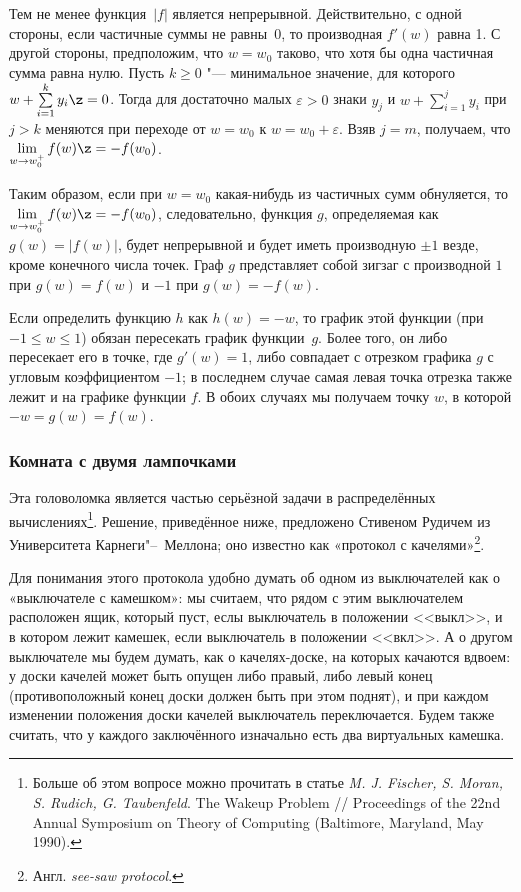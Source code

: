 \documentclass[twoside]{book}
\begin{document}
Тем не менее функция~$|f|$ является непрерывной.
Действительно, с одной
стороны, если частичные суммы не равны~$0$, то производная $f'(w)$
равна 1.
С другой стороны, предположим, что $w=w_0$ таково, что хотя
бы одна частичная сумма равна нулю.
Пусть $k\ge0$ "--- минимальное
значение, для которого\vspace{-2\jot} $w+\sum\limits_{i=1}^{k}y_i\z=0$.
Тогда для достаточно малых $\varepsilon>0$ знаки $y_j$ и
$w+\sum\limits_{i=1}^{j}y_i$ при $j>k$ меняются при переходе от
$w=w_0$ к $w=w_0+\varepsilon$.
Взяв $j = m$, получаем, что
$\lim\limits_{w\to w_0^+}f(w)\z=-f(w_0)$.

Таким образом, если при $w=w_0$ какая-нибудь из частичных сумм
обнуляется, то $\lim\limits_{w\to w_0^+}f(w)\z=-f(w_0)$,
следовательно, функция $g$, определяемая как $g(w) =|f(w)|$, будет
непрерывной и будет иметь производную $\pm1$ везде, кроме конечного
числа точек.
Граф $g$ представляет собой зигзаг с производной $1$ при
$g(w)=f(w)$ и $-1$ при $g(w)=-f(w)$.

Если определить функцию $h$ как $h (w) = -w$, то график этой функции
(при $-1\le w\le1$) обязан пересекать график функции~$g$.
Более того,
он либо пересекает его в точке, где $g'(w) = 1$, либо совпадает с
отрезком графика $g$ с угловым коэффициентом $-1$; в последнем случае
самая левая точка отрезка также лежит и на графике функции $f$.
В
обоих случаях мы получаем точку $w$, в которой $-w = g (w) = f (w)$.
\heart

\subsubsection*{Комната с двумя лампочками}

Эта головоломка является частью серьёзной задачи в распределённых
вычислениях\footnote{Больше об этом вопросе можно прочитать в статье
\emph{M. J. Fischer, S. Moran, S. Rudich, G. Taubenfeld}. The Wakeup Problem /\!/ Proceedings of the 22nd Annual Symposium on Theory of Computing (Baltimore, Maryland, May 1990).}.
Решение, приведённое
ниже, предложено Стивеном Рудичем из Университета Карнеги"--~Меллона; 
оно известно как «протокол с качелями»\footnote{Англ. \emph{see-saw   protocol}.}.

\medskip

Для понимания этого протокола удобно думать об одном из выключателей
как о «выключателе с камешком»: мы считаем, что рядом с этим
выключателем расположен ящик, который пуст, еслы выключатель в
положении <<выкл>>, и в котором лежит камешек, если выключатель в
положении <<вкл>>.
А о другом выключателе мы будем думать, как о
качелях-доске, на которых качаются вдвоем: у доски качелей может быть
опущен либо правый, либо левый конец (противоположный конец доски
должен быть при этом поднят), и при каждом изменении положения доски
качелей выключатель переключается.
Будем также считать, что у каждого
заключённого изначально есть два виртуальных камешка.
\end{document}
